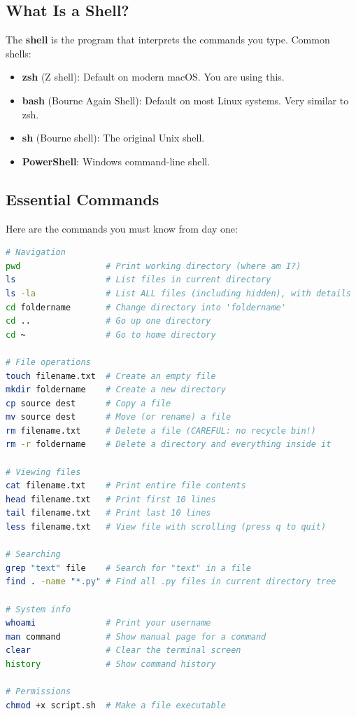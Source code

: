 \documentclass[12pt, a4paper, oneside]{book}
\begin{document}
\subsection{What Is a Shell?}

The \textbf{shell} is the program that interprets the commands you type. Common shells:

\begin{itemize}[leftmargin=2em]
    \item \textbf{zsh} (Z shell): Default on modern macOS. You are using this.
    \item \textbf{bash} (Bourne Again Shell): Default on most Linux systems. Very similar to zsh.
    \item \textbf{sh} (Bourne shell): The original Unix shell.
    \item \textbf{PowerShell}: Windows command-line shell.
\end{itemize}

\subsection{Essential Commands}

Here are the commands you must know from day one:

\begin{lstlisting}[language=bash, caption={Essential terminal commands}]
# Navigation
pwd                 # Print working directory (where am I?)
ls                  # List files in current directory
ls -la              # List ALL files (including hidden), with details
cd foldername       # Change directory into 'foldername'
cd ..               # Go up one directory
cd ~                # Go to home directory

# File operations
touch filename.txt  # Create an empty file
mkdir foldername    # Create a new directory
cp source dest      # Copy a file
mv source dest      # Move (or rename) a file
rm filename.txt     # Delete a file (CAREFUL: no recycle bin!)
rm -r foldername    # Delete a directory and everything inside it

# Viewing files
cat filename.txt    # Print entire file contents
head filename.txt   # Print first 10 lines
tail filename.txt   # Print last 10 lines
less filename.txt   # View file with scrolling (press q to quit)

# Searching
grep "text" file    # Search for "text" in a file
find . -name "*.py" # Find all .py files in current directory tree

# System info
whoami              # Print your username
man command         # Show manual page for a command
clear               # Clear the terminal screen
history             # Show command history

# Permissions
chmod +x script.sh  # Make a file executable
\end{lstlisting}
\end{document}
